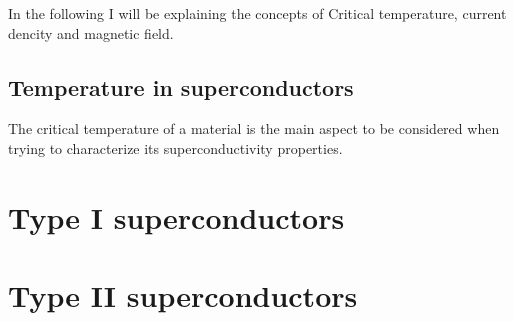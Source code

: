 In the following I will be explaining the concepts of Critical temperature, current dencity and
magnetic field.

\subsection{Temperature in superconductors}
\label{sus:temp-soupcond}
The critical temperature of a material is the main aspect to be considered when trying to
characterize its superconductivity properties.

\section{Type I superconductors}
\label{sec:type1}
\section{Type II superconductors}
\label{sec:type2}

